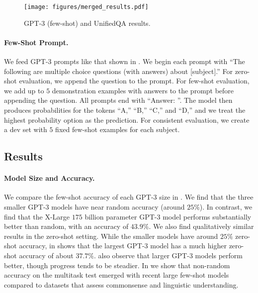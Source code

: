 \begin{wrapfigure}{R}{0.5\textwidth}
	\vspace{-5pt}
	\begin{center}
	\texttt{[image: figures/merged\_results.pdf]}
	\end{center}
	\vspace{-10pt}
	\caption{
	GPT-3 (few-shot) and UnifiedQA results.
    }\label{fig:fullresults}
	\vspace{-50pt}
\end{wrapfigure}

\paragraph{Few-Shot Prompt.} We feed GPT-3 prompts like that shown in . We begin each prompt with ``The following are multiple choice questions (with answers) about [subject].'' For zero-shot evaluation, we append the question to the prompt. For few-shot evaluation, we add up to $5$ demonstration examples with answers to the prompt before appending the question. All prompts end with ``Answer: ''. The model then produces probabilities for the tokens ``A,'' ``B,'' ``C,'' and ``D,'' and we treat the highest probability option as the prediction. %
For consistent evaluation, we create a dev set with $5$ fixed few-shot examples for each subject.

\subsection{Results}

\paragraph{Model Size and Accuracy.}

We compare the few-shot accuracy of each GPT-3 size in . We find that the three smaller GPT-3 models have near random accuracy (around $25\%$). %
In contrast, we find that the X-Large $175$ billion parameter GPT-3 model performs substantially better than random, with an accuracy of $43.9\%$. We also find qualitatively similar results in the zero-shot setting. While the smaller models have around $25\%$ zero-shot accuracy,  in  shows that the largest GPT-3 model has a much higher zero-shot accuracy of about $37.7\%$. \citet{brown2020gpt3} also observe that larger GPT-3 models perform better, though progress tends to be steadier. In  we show that non-random accuracy on the multitask test emerged with recent large few-shot models compared to datasets that assess commonsense and linguistic understanding.

